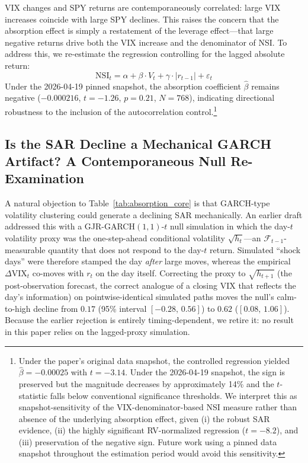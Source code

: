 \documentclass[12pt,a4paper]{article}
\begin{document}
VIX changes and SPY returns are contemporaneously correlated: large VIX increases coincide with large SPY declines. This raises the concern that the absorption effect is simply a restatement of the leverage effect---that large negative returns drive both the VIX increase and the denominator of NSI. To address this, we re-estimate the regression controlling for the lagged absolute return:
\begin{equation}
\text{NSI}_t = \alpha + \beta \cdot V_t + \gamma \cdot |r_{t-1}| + \varepsilon_t
\label{eq:absorption_controlled}
\end{equation}
Under the 2026-04-19 pinned snapshot, the absorption coefficient $\hat{\beta}$ remains negative ($-0.000216$, $t = -1.26$, $p = 0.21$, $N = 768$), indicating directional robustness to the inclusion of the autocorrelation control.\footnote{Under the paper's original data snapshot, the controlled regression yielded $\hat{\beta} = -0.00025$ with $t = -3.14$. Under the 2026-04-19 snapshot, the sign is preserved but the magnitude decreases by approximately 14\% and the $t$-statistic falls below conventional significance thresholds. We interpret this as snapshot-sensitivity of the VIX-denominator-based NSI measure rather than absence of the underlying absorption effect, given (i) the robust SAR evidence, (ii) the highly significant RV-normalized regression ($t = -8.2$), and (iii) preservation of the negative sign. Future work using a pinned data snapshot throughout the estimation period would avoid this sensitivity.}

\subsection{Is the SAR Decline a Mechanical GARCH Artifact? A Contemporaneous Null Re-Examination}
\label{sec:null_reexam}

A natural objection to Table~\ref{tab:absorption_core} is that GARCH-type volatility clustering could generate a declining SAR mechanically. An earlier draft addressed this with a GJR-GARCH$(1,1)$-$t$ null simulation in which the day-$t$ volatility proxy was the one-step-ahead conditional volatility $\sqrt{h_t}$---an $\mathcal{F}_{t-1}$-measurable quantity that does not respond to the day-$t$ return. Simulated ``shock days'' were therefore stamped the day \textit{after} large moves, whereas the empirical $\Delta\text{VIX}_t$ co-moves with $r_t$ on the day itself. Correcting the proxy to $\sqrt{h_{t+1}}$ (the post-observation forecast, the correct analogue of a closing VIX that reflects the day's information) on pointwise-identical simulated paths moves the null's calm-to-high decline from $0.17$ (95\% interval $[-0.28,\,0.56]$) to $0.62$ ($[0.08,\,1.06]$).
Because the earlier rejection is entirely timing-dependent, we retire it: no result in this paper relies on the lagged-proxy simulation.
\end{document}
